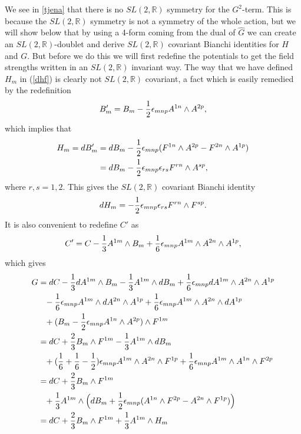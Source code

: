 We see in \ref{tjena} that there is no $SL(2,{\mathbb R})$ symmetry for the $G^2$-term. This is because the $SL(2,{\mathbb R})$ 
symmetry is not a symmetry of the whole action, but we will show below that by using a 4-form coming from the dual of $\hat{G}$ 
we can create an $SL(2,{\mathbb R})$-doublet and derive $SL(2,{\mathbb R})$ covariant Bianchi identities for $H$ and $G$.
But before we do this we will first redefine the potentials to get the field strengths written in an $SL(2,{\mathbb R})$ 
invariant way. The way that we have defined $H_m$ in (\ref{dhf}) is clearly not $SL(2,{\mathbb R})$ covariant, 
a fact which is easily remedied by the redefinition
\begin{equation}
B'_m = B_m - {1 \over 2}{\epsilon}_{mnp}A^{1n} \wedge A^{2p},
\end{equation}
which implies that
\begin{align}
H_m=dB'_m &= dB_m - {1 \over 2}{\epsilon}_{mnp}(F^{1n} \wedge A^{2p} - F^{2n} \wedge A^{1p}) \nonumber \\
&=dB_m - {1 \over 2}{\epsilon}_{mnp}{\epsilon}_{rs}F^{rn} \wedge A^{sp},
\end{align}
where $r,s = 1,2$. This gives the $SL(2,{\mathbb R})$ covariant Bianchi identity
\begin{equation}
dH_m=-{1 \over 2}{\epsilon}_{mnp}{\epsilon}_{rs}F^{rn} \wedge F^{sp}.
\end{equation}
It is also convenient to redefine $C'$ as
\begin{equation}
C'=C - {1 \over 3}A^{1m} \wedge B_m + {1 \over 6}{\epsilon}_{mnp}A^{1m} \wedge A^{2n} \wedge A^{1p},
\end{equation}
which gives
\begin{align}
G &= dC -{1 \over 3}dA^{1m} \wedge B_m - {1 \over 3}A^{1m} \wedge dB_m +{1 \over 6}{\epsilon}_{mnp}dA^{1m} \wedge A^{2n} \wedge A^{1p} \nonumber \\
&\phantom{=}-{1 \over 6}{\epsilon}_{mnp}A^{1m} \wedge dA^{2n} \wedge A^{1p} + {1 \over 6}{\epsilon}_{mnp}A^{1m} \wedge A^{2n} \wedge dA^{1p} \nonumber \\
&\phantom{=}+(B_m - {1 \over 2}{\epsilon}_{mnp}A^{1n} \wedge A^{2p})\wedge F^{1m} \nonumber \\
&=dC + {2 \over 3}B_m \wedge F^{1m} - {1 \over 3}A^{1m} \wedge dB_m \nonumber \\
&\phantom{=}+({1 \over 6}+{1 \over 6}-{1 \over 2}){\epsilon}_{mnp}A^{1m} \wedge A^{2n} \wedge F^{1p} + {1 \over 6}{\epsilon}_{mnp}A^{1m} \wedge A^{1n} \wedge F^{2p} \nonumber \\
&=dC + {2 \over 3}B_m \wedge F^{1m} \nonumber \\
& \phantom{=}+ {1 \over 3}A^{1m} \wedge \Big{(}dB_m + {1 \over 2}{\epsilon}_{mnp}(A^{1n} \wedge F^{2p} - A^{2n} \wedge F^{1p}) \Big{)} \nonumber \\
&=dC + {2 \over 3}B_m \wedge F^{1m} + {1 \over 3}A^{1m} \wedge H_m
\end{align}
